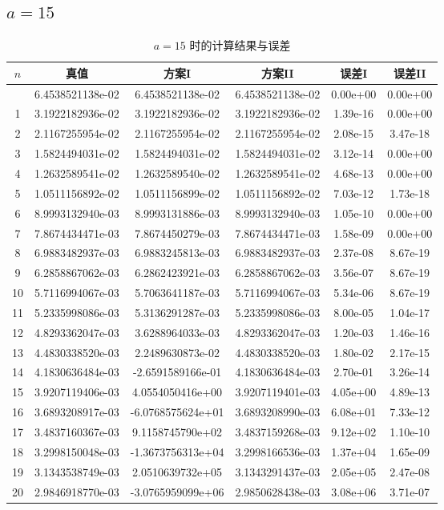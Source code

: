 \documentclass[12pt,a4paper]{ctexart}
\begin{document}
\subsection*{$a=15$}
\begin{longtable}{cccccc}
\caption{$a=15$ 时的计算结果与误差}\label{tab:a15}\\
\toprule
$n$ & 真值 & 方案I & 方案II & 误差I & 误差II \\
\midrule
\endfirsthead
\bottomrule
\endfoot
0  & 6.4538521138e-02 & 6.4538521138e-02 & 6.4538521138e-02 & 0.00e+00 & 0.00e+00 \\
1  & 3.1922182936e-02 & 3.1922182936e-02 & 3.1922182936e-02 & 1.39e-16 & 0.00e+00 \\
2  & 2.1167255954e-02 & 2.1167255954e-02 & 2.1167255954e-02 & 2.08e-15 & 3.47e-18 \\
3  & 1.5824494031e-02 & 1.5824494031e-02 & 1.5824494031e-02 & 3.12e-14 & 0.00e+00 \\
4  & 1.2632589541e-02 & 1.2632589540e-02 & 1.2632589541e-02 & 4.68e-13 & 0.00e+00 \\
5  & 1.0511156892e-02 & 1.0511156899e-02 & 1.0511156892e-02 & 7.03e-12 & 1.73e-18 \\
6  & 8.9993132940e-03 & 8.9993131886e-03 & 8.9993132940e-03 & 1.05e-10 & 0.00e+00 \\
7  & 7.8674434471e-03 & 7.8674450279e-03 & 7.8674434471e-03 & 1.58e-09 & 0.00e+00 \\
8  & 6.9883482937e-03 & 6.9883245813e-03 & 6.9883482937e-03 & 2.37e-08 & 8.67e-19 \\
9  & 6.2858867062e-03 & 6.2862423921e-03 & 6.2858867062e-03 & 3.56e-07 & 8.67e-19 \\
10 & 5.7116994067e-03 & 5.7063641187e-03 & 5.7116994067e-03 & 5.34e-06 & 8.67e-19 \\
11 & 5.2335998086e-03 & 5.3136291287e-03 & 5.2335998086e-03 & 8.00e-05 & 1.04e-17 \\
12 & 4.8293362047e-03 & 3.6288964033e-03 & 4.8293362047e-03 & 1.20e-03 & 1.46e-16 \\
13 & 4.4830338520e-03 & 2.2489630873e-02 & 4.4830338520e-03 & 1.80e-02 & 2.17e-15 \\
14 & 4.1830636484e-03 & -2.6591589166e-01 & 4.1830636484e-03 & 2.70e-01 & 3.26e-14 \\
15 & 3.9207119406e-03 &  4.0554050416e+00 & 3.9207119401e-03 & 4.05e+00 & 4.89e-13 \\
16 & 3.6893208917e-03 & -6.0768575624e+01 & 3.6893208990e-03 & 6.08e+01 & 7.33e-12 \\
17 & 3.4837160367e-03 &  9.1158745790e+02 & 3.4837159268e-03 & 9.12e+02 & 1.10e-10 \\
18 & 3.2998150048e-03 & -1.3673756313e+04 & 3.2998166536e-03 & 1.37e+04 & 1.65e-09 \\
19 & 3.1343538749e-03 &  2.0510639732e+05 & 3.1343291437e-03 & 2.05e+05 & 2.47e-08 \\
20 & 2.9846918770e-03 & -3.0765959099e+06 & 2.9850628438e-03 & 3.08e+06 & 3.71e-07 \\
\bottomrule
\end{longtable}
\end{document}

